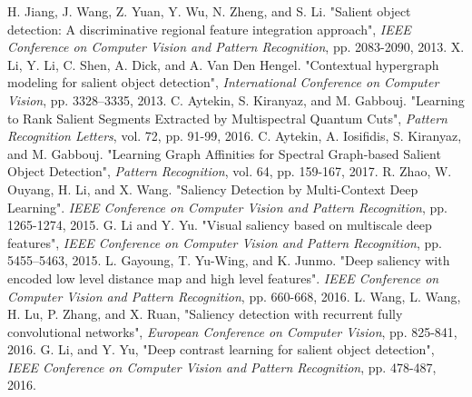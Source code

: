 \documentclass[a4paper,conference]{IEEEtran}
\begin{document}
\begin{thebibliography}{1}
H. Jiang, J. Wang, Z. Yuan, Y. Wu, N. Zheng, and S. Li. "Salient object detection: A discriminative regional feature integration approach", \emph{IEEE Conference on Computer Vision and Pattern Recognition}, pp. 2083-2090, 2013.
X. Li, Y. Li, C. Shen, A. Dick, and A. Van Den Hengel. "Contextual hypergraph modeling for salient object detection", \emph{International Conference on Computer Vision}, pp. 3328–3335, 2013.
C. Aytekin, S. Kiranyaz, and M. Gabbouj. "Learning to Rank Salient Segments Extracted by Multispectral Quantum Cuts", \emph{Pattern Recognition Letters}, vol. 72, pp. 91-99, 2016.
C. Aytekin, A. Iosifidis, S. Kiranyaz, and M. Gabbouj. "Learning Graph Affinities for Spectral Graph-based Salient Object Detection", \emph{Pattern Recognition}, vol. 64, pp. 159-167, 2017.
R. Zhao, W. Ouyang, H. Li, and X. Wang. "Saliency Detection by Multi-Context Deep Learning". \emph{IEEE Conference on Computer Vision and Pattern Recognition}, pp. 1265-1274, 2015.
G. Li and Y. Yu. "Visual saliency based on multiscale deep features", \emph{IEEE Conference on Computer Vision and Pattern Recognition}, pp. 5455–5463, 2015.
L. Gayoung, T. Yu-Wing, and K. Junmo. "Deep saliency with encoded low level distance map and high level features". \emph{IEEE Conference on Computer Vision and Pattern Recognition}, pp. 660-668, 2016.
L. Wang, L. Wang, H. Lu, P. Zhang, and X. Ruan, "Saliency detection with recurrent fully convolutional networks", \emph{European Conference on Computer Vision}, pp. 825-841, 2016.
G. Li, and Y. Yu, "Deep contrast learning for salient object detection", \emph{IEEE Conference on Computer Vision and Pattern Recognition}, pp. 478-487, 2016.


\end{thebibliography}
\end{document}
